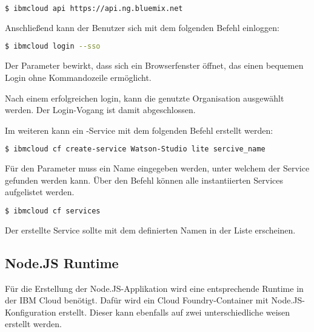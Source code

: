 \begin{lstlisting}[language=bash, caption=Setzen des API Targets, label=Setzen des API Targets]
    $ ibmcloud api https://api.ng.bluemix.net
\end{lstlisting}

Anschließend kann der Benutzer sich mit dem folgenden Befehl einloggen:

\begin{lstlisting}[language=bash, caption=Login über CLI und SSO, label=Login über CLI und SSO]
    $ ibmcloud login --sso
\end{lstlisting}

Der Parameter  bewirkt, dass sich ein Browserfenster öffnet, das einen bequemen Login ohne Kommandozeile
ermöglicht.

Nach einem erfolgreichen login, kann die genutzte Organisation ausgewählt werden. Der Login-Vogang ist damit abgeschlossen.

Im weiteren kann ein -Service mit dem folgenden Befehl erstellt werden:

\begin{lstlisting}[language=bash, caption=Instanziierung des Watson Studio Services, label=Instanziierung des Watson Studio Services]
    $ ibmcloud cf create-service Watson-Studio lite sercive_name
\end{lstlisting}

Für den Parameter  muss ein Name eingegeben werden, unter welchem der Service gefunden werden kann.
Über den Befehl  können alle instantiierten Services aufgelistet werden.

\begin{lstlisting}[language=bash, caption=Auflisten aller Services, label=Auflisten aller Services]
    $ ibmcloud cf services
\end{lstlisting}

Der erstellte Service sollte mit dem definierten Namen in der Liste erscheinen.

\subsection{Node.JS Runtime}
\label{ssc:nodejs_runtime}
Für die Erstellung der Node.JS-Applikation wird eine entsprechende Runtime in der IBM Cloud benötigt. Dafür wird ein
Cloud Foundry-Container mit Node.JS-Konfiguration erstellt. Dieser kann ebenfalls auf zwei unterschiedliche weisen erstellt
werden.

